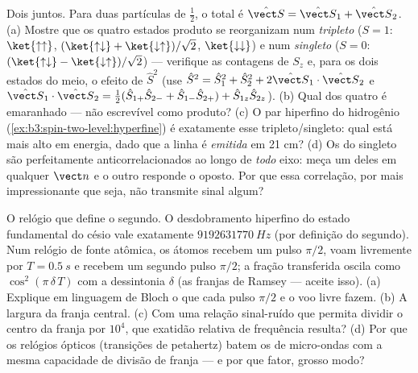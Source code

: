 \begin{exercise}[$\star\star\star$]\label{exo:b3:spin-two-level:11}
Dois  juntos. Para duas partículas de  $\tfrac12$, o 
total é $\hat{\vect S} = \hat{\vect S}_1 + \hat{\vect S}_2$. (a) Mostre
que os quatro estados produto se reorganizam num \emph{tripleto} ($S = 1$:
$\ket{\uparrow\uparrow}$, $(\ket{\uparrow\downarrow} +
\ket{\downarrow\uparrow})/\sqrt2$, $\ket{\downarrow\downarrow}$)
e num \emph{singleto} ($S = 0$: $(\ket{\uparrow\downarrow} -
\ket{\downarrow\uparrow})/\sqrt2$) --- verifique as contagens de $S_z$
e, para os dois estados do meio, o efeito de $\hat S^2$ (use $\hat
S^2 = \hat S_1^2 + \hat S_2^2 + 2\hat{\vect S}_1\cdot\hat{\vect
S}_2$ e $\hat{\vect S}_1\cdot\hat{\vect S}_2 = \tfrac12(\hat
S_{1+}\hat S_{2-} + \hat S_{1-}\hat S_{2+}) + \hat S_{1z}\hat
S_{2z}$). (b) Qual dos quatro é emaranhado --- não escrevível como
produto? (c) O par hiperfino do hidrogênio
(\cref{ex:b3:spin-two-level:hyperfine}) é exatamente esse
tripleto/singleto: qual está mais alto em energia, dado que a linha é
\emph{emitida} em 21 cm? (d) Os  do singleto são perfeitamente
anticorrelacionados ao longo de \emph{todo} eixo: meça um deles em
qualquer $\vect n$ e o outro responde o oposto. Por que essa
correlação, por mais impressionante que seja, não transmite sinal
algum?
\end{exercise}

\begin{exercise}[$\star\star\star$]\label{exo:b3:spin-two-level:12}
O relógio que define o segundo. O desdobramento hiperfino do estado
fundamental do césio vale exatamente $\qty{9192631770}{Hz}$ (por
definição do segundo). Num relógio de fonte atômica, os átomos recebem
um pulso $\pi/2$, voam livremente por $T = \qty{0.5}{s}$ e recebem um
segundo pulso $\pi/2$; a fração transferida oscila como
$\cos^2(\pi\,\delta\,T)$ com a dessintonia $\delta$ (as franjas de
Ramsey --- aceite isso). (a) Explique em linguagem de Bloch o que cada
pulso $\pi/2$ e o voo livre fazem. (b) A largura da franja central. (c)
Com uma relação sinal-ruído que permita dividir o centro da franja por
$10^4$, que exatidão relativa de frequência resulta? (d) Por que os
relógios ópticos (transições de petahertz) batem os de micro-ondas com
a mesma capacidade de divisão de franja --- e por que fator, grosso
modo?
\end{exercise}

